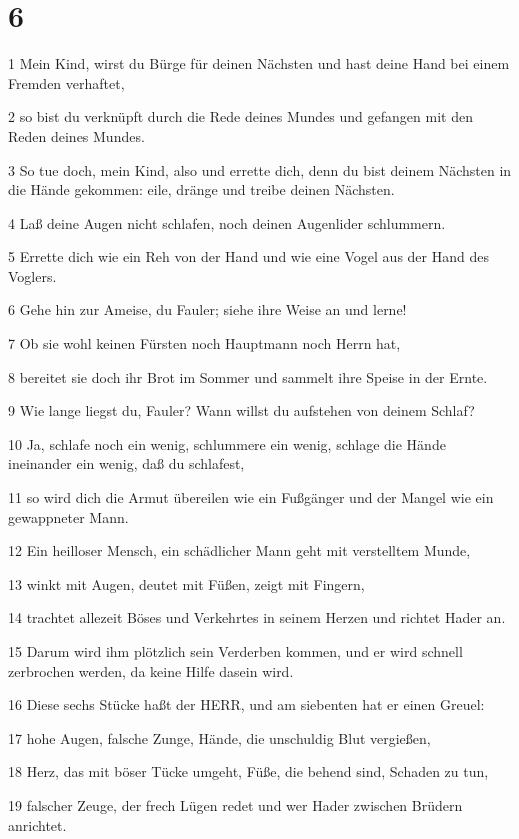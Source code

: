 \chapter{6}

\par 1 Mein Kind, wirst du Bürge für deinen Nächsten und hast deine Hand bei einem Fremden verhaftet,
\par 2 so bist du verknüpft durch die Rede deines Mundes und gefangen mit den Reden deines Mundes.
\par 3 So tue doch, mein Kind, also und errette dich, denn du bist deinem Nächsten in die Hände gekommen: eile, dränge und treibe deinen Nächsten.
\par 4 Laß deine Augen nicht schlafen, noch deinen Augenlider schlummern.
\par 5 Errette dich wie ein Reh von der Hand und wie eine Vogel aus der Hand des Voglers.
\par 6 Gehe hin zur Ameise, du Fauler; siehe ihre Weise an und lerne!
\par 7 Ob sie wohl keinen Fürsten noch Hauptmann noch Herrn hat,
\par 8 bereitet sie doch ihr Brot im Sommer und sammelt ihre Speise in der Ernte.
\par 9 Wie lange liegst du, Fauler? Wann willst du aufstehen von deinem Schlaf?
\par 10 Ja, schlafe noch ein wenig, schlummere ein wenig, schlage die Hände ineinander ein wenig, daß du schlafest,
\par 11 so wird dich die Armut übereilen wie ein Fußgänger und der Mangel wie ein gewappneter Mann.
\par 12 Ein heilloser Mensch, ein schädlicher Mann geht mit verstelltem Munde,
\par 13 winkt mit Augen, deutet mit Füßen, zeigt mit Fingern,
\par 14 trachtet allezeit Böses und Verkehrtes in seinem Herzen und richtet Hader an.
\par 15 Darum wird ihm plötzlich sein Verderben kommen, und er wird schnell zerbrochen werden, da keine Hilfe dasein wird.
\par 16 Diese sechs Stücke haßt der HERR, und am siebenten hat er einen Greuel:
\par 17 hohe Augen, falsche Zunge, Hände, die unschuldig Blut vergießen,
\par 18 Herz, das mit böser Tücke umgeht, Füße, die behend sind, Schaden zu tun,
\par 19 falscher Zeuge, der frech Lügen redet und wer Hader zwischen Brüdern anrichtet.
